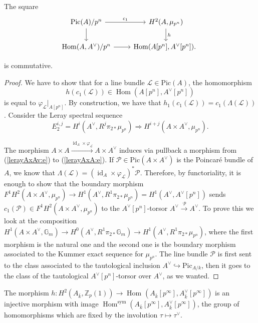\documentclass[11pt]{amsart}
\newcommand{\kbar}{{\bar{k}}}
\newcommand{\Zp}{{\mathbb{Z}_{p}}}
\newcommand{\Gm}{\mathbb{G}_m}
\newcommand{\sym}{{\mathrm{sym}}}
\newcommand{\calL}{\mathcal{L}}
\newcommand{\calP}{\mathcal{P}}
\DeclareMathOperator{\Hom}{Hom}
\DeclareMathOperator{\id}{id}
\newcommand{\Pic}{\mathrm{Pic}}
\newcommand{\mupn}{{\mu_{p^n}}}
\begin{document}
\begin{prop}\label{comm-squa:p}
The square
		\begin{equation}
	\begin{tikzcd}
		\Pic(A)/p^n \arrow[d,""]\arrow[r,"c_1"] & H^2_{}(A,\mupn) \arrow[d,"h"]\\
		\Hom(A,A^\vee)/p^n \arrow[r]& \Hom(A[p^n],A^\vee[p^n]).\
	\end{tikzcd}
\end{equation}

is commutative.
\end{prop}
\begin{proof}
We have to show that for a line bundle $\calL\in \Pic(A)$, the homomorphism $$h(c_1(\calL))\in  \Hom(A[p^n],A^\vee[p^n])$$ is equal to $\varphi_{\calL}|_{A[p^n]}$. By construction, we have that $h_1(c_1(\calL))=c_1(\Lambda(\calL))$. Consider the Leray spectral sequence 
\begin{equation}\label{lerayAxAv:e}
E^{i,j}_2=H^i(A^\vee,R^j\pi_{2*}\mupn)\Rightarrow H^{i+j}(A\times A^\vee,\mupn).
\end{equation}


The morphism $A\times A\xrightarrow{\id_A\times \varphi_{\calL}} A\times A^\vee$ induces via pullback a morphism from (\ref{lerayAxAv:e}) to (\ref{lerayAxA:e}). If $\calP\in \Pic({A\times A^\vee})$ is the Poincaré bundle of $A$, we know that $\Lambda(\calL)=(\id_A\times \varphi_{\calL})^* \calP.$ Therefore, by functoriality, it is enough to show that the boundary morphism $F^1H^2(A\times A^\vee,\mupn)\to H^1(A^\vee,R^1\pi_{2*}\mupn)=H^1(A^\vee,A^\vee[p^n])$ sends $c_1(\calP)\in F^1H^2(A\times A^\vee,\mupn)$ to the $A^\vee[p^n]$-torsor $A^\vee\xrightarrow{\cdot p}A^\vee$. To prove this we look at the composition $H^1(A\times A^\vee,\Gm)\to H^0(A^\vee,R^1\pi_{2*}\Gm)\to H^1(A^\vee,R^1\pi_{2*}\mupn)$, where the first morphism is the natural one and the second one is the boundary morphism associated to the Kummer exact sequence for $\mupn$. The line bundle $\calP$ is first sent to the class associated to the tautological inclusion $A^\vee \hookrightarrow \Pic_{A/k}$, then it goes to the class of the tautological $A^\vee[p^n]$-torsor over $A^\vee$, as we wanted.
\end{proof}



\begin{prop}\label{imag:p}
The morphism $h:H^2(A_\kbar,\Zp(1))\to \Hom_{}(A_\kbar[p^\infty],A^\vee_\kbar[p^\infty])$ is an injective morphism with image $\Hom^\sym_{}(A_\kbar[p^\infty],A^\vee_\kbar[p^\infty])$, the group of homomorphisms which are fixed by the involution $\tau\mapsto \tau^\vee$.
\end{prop}
\end{document}
